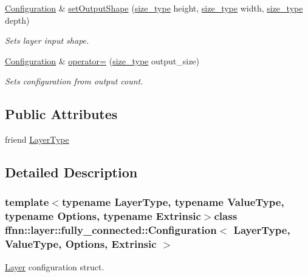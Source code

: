 \begin{DoxyCompactItemize}
\hyperlink{classffnn_1_1layer_1_1fully__connected_1_1_configuration}{Configuration} \& \hyperlink{classffnn_1_1layer_1_1fully__connected_1_1_configuration_a5f3a8300c013879d62ba166b8add7e11}{set\-Output\-Shape} (\hyperlink{namespaceffnn_a63b90a2fd70eb76684eac482a51633e5}{size\-\_\-type} height, \hyperlink{namespaceffnn_a63b90a2fd70eb76684eac482a51633e5}{size\-\_\-type} width, \hyperlink{namespaceffnn_a63b90a2fd70eb76684eac482a51633e5}{size\-\_\-type} depth)
\begin{DoxyCompactList}\small\item\em Sets layer input shape. \end{DoxyCompactList}\item 
\hyperlink{classffnn_1_1layer_1_1fully__connected_1_1_configuration}{Configuration} \& \hyperlink{classffnn_1_1layer_1_1fully__connected_1_1_configuration_a5b1e4a818190551c4d59effe1358f2e7}{operator=} (\hyperlink{namespaceffnn_a63b90a2fd70eb76684eac482a51633e5}{size\-\_\-type} output\-\_\-size)
\begin{DoxyCompactList}\small\item\em Sets configuration from output count. \end{DoxyCompactList}\end{DoxyCompactItemize}
\subsection*{Public Attributes}
\begin{DoxyCompactItemize}
\item 
friend \hyperlink{classffnn_1_1layer_1_1fully__connected_1_1_configuration_a935cd081500398ecc6c5ed195dbc9402}{Layer\-Type}
\end{DoxyCompactItemize}


\subsection{Detailed Description}
\subsubsection*{template$<$typename Layer\-Type, typename Value\-Type, typename Options, typename Extrinsic$>$class ffnn\-::layer\-::fully\-\_\-connected\-::\-Configuration$<$ Layer\-Type, Value\-Type, Options, Extrinsic $>$}

\hyperlink{classffnn_1_1layer_1_1_layer}{Layer} configuration struct. 

